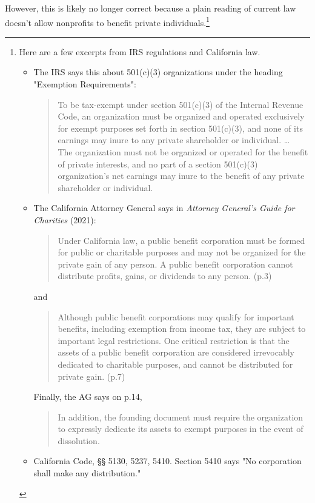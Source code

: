 However, this is likely no longer correct because a plain reading of current law doesn't allow nonprofits to benefit private individuals.\footnote{Here are a few excerpts from IRS regulations and California law.
  
  \begin{itemize}%
    \item The IRS says this about 501(c)(3) organizations under the heading "Exemption Requirements":
    \begin{quote}\noindent
      To be tax-exempt under section 501(c)(3) of the Internal Revenue Code, an organization must be organized and operated exclusively for exempt purposes set forth in section 501(c)(3), and none of its earnings may inure to any private shareholder or individual.
      \ldots\\
      The organization must not be organized or operated for the benefit of private interests, and no part of a section 501(c)(3) organization's net earnings may inure to the benefit of any private shareholder or individual.
    \end{quote}
    \item The California Attorney General says in \textit{Attorney General's Guide for Charities} (2021):
    \begin{quote}
      Under California law, a public beneﬁt corporation must be formed for public or charitable purposes and may not be organized for the private gain of any person. A public beneﬁt corporation cannot distribute proﬁts, gains, or dividends to any person. (p.3)
    \end{quote}
    and
    \begin{quote}
      Although public beneﬁt corporations may qualify for important beneﬁts, including exemption from income tax, they are subject to important legal restrictions. One critical restriction is that the assets of a public beneﬁt corporation are considered irrevocably dedicated to charitable purposes, and cannot be distributed for private gain. (p.7)
    \end{quote}
    Finally, the AG says on p.14,
    \begin{quote}
      In addition, the founding document must require the organization to expressly dedicate its assets to exempt purposes in the event of dissolution.
    \end{quote}
    \item California Code, §§ 5130, 5237, 5410. Section 5410 says "No corporation shall make any distribution."
  \end{itemize}}
